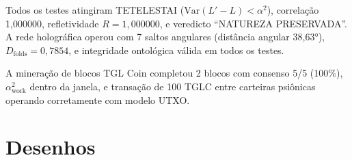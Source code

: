 \documentclass[12pt,a4paper]{article}
\newcommand{\alphaii}{\alpha^2}
\newcommand{\Dfolds}{D_{\text{folds}}}
\begin{document}
Todos os testes atingiram TETELESTAI ($\text{Var}(L'-L) <
\alphaii$), correlação 1,000000, refletividade $R = 1{,}000000$,
e veredicto ``NATUREZA PRESERVADA''. A rede holográfica operou
com 7 saltos angulares (distância angular 38,63°),
$\Dfolds = 0{,}7854$, e integridade ontológica válida em todos
os testes.

A mineração de blocos TGL Coin completou 2 blocos com consenso
5/5 (100\%), $\alphaii_{\text{work}}$ dentro da janela, e
transação de 100 TGLC entre carteiras psiônicas operando
corretamente com modelo UTXO.

\newpage
\section{Desenhos}
\end{document}
